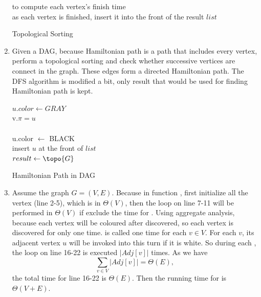 \documentclass{assignment}
\begin{document}
\begin{homeworkProblem}
\begin{enumerate}
  \begin{algorithm}[H]
 \BlankLine
{} to compute each vertex's finish time \\
as each vertex is finished, insert it into the front of the result $list$ \\

	
\caption{Topological Sorting} \end{algorithm}
\item Given a DAG, because Hamiltonian path is a path that includes every vertex, perform a topological sorting and check whether successive vertices are connect in the graph. These edges form a directed Hamiltonian path. The DFS algorithm is modified a bit, only result that would be used for finding Hamiltonian path is kept.


  \begin{algorithm}[H]
 \BlankLine
{}
 {
	$u.color \leftarrow GRAY$ \\
	 {
		 {
		v.$\pi = u$ \\
			 \\		
		}
	}
	u.color $\leftarrow$ BLACK \\
	insert $u$ at the front of $list$\\
}	
$result\leftarrow \topo{G}$ \\
 {
	 {
	}
	
}

	
\caption{Hamiltonian Path in DAG} \end{algorithm}

\item Assume the graph $G = (V, E)$. Because in function \topo , first initialize all the vertex (line 2-5), which is in $\Theta(V)$, then the loop on line 7-11 will be performed in $\Theta(V)$ if exclude the time for \topolo . Using aggregate analysis, because each vertex will be coloured after discovered, so each vertex is discovered for only one time. \topolo is called one time for each $v \in V$. For each $v$, its adjacent vertex $u$ will be invoked into this turn if it is white. So during each , the loop on line 16-22 is executed $|Adj[v]|$ times. As we have $$\sum_{v\in V}|Adj[v]| = \Theta(E),$$ the total time for line 16-22 is $\Theta(E)$. Then the running time for \topo is $\Theta(V + E)$.


\end{enumerate}
\end{homeworkProblem}
\end{document}
